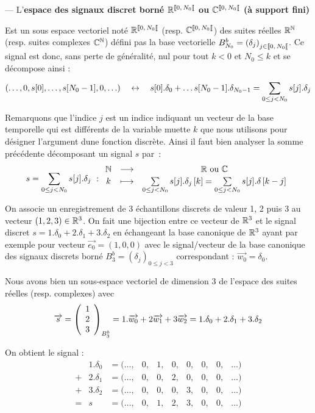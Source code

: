 \begin{definition}
  \label{def:signal_discret_borne}
  --- L'\textbf{espace des signaux discret borné $\RNborne$ ou
    $\CNborne$ (à support fini)}

  Est un sous espace vectoriel noté $\RNborne$ (resp. $\CNborne$) des
  suites réelles $\mathbb{R}^{\mathbb{N}}$ (resp. suites complexes $\mathbb{C}^{\mathbb{N}}$) défini pas la
  base vectorielle $B_{N_0}^b=\left(\delta_j\right)_{j\in\SN0}$. Ce
  signal est donc, sans perte de généralité, nul pour tout $k<0$ et
  $ N_0\leq k$ et se décompose ainsi :
  \begin{equation*}
    (\ldots,0, s[0], \dots, s[N_0-1], 0, \ldots) \quad \leftrightarrow \quad s[0].\delta_0 + \dots s[N_0-1].\delta_{N_0-1} = \sum\limits_{0\leq j< N_0}^{}{s[j].\delta_j}
  \end{equation*}

  
\end{definition}

Remarquons que l'indice $j$ est un indice indiquant un vecteur de la
base temporelle qui est différents de la variable muette $k$ que nous
utilisons pour désigner l'argument dune fonction discrète. Ainsi il
faut bien analyser la somme précédente décomposant un signal $s$ par~:
\begin{equation}
  s = \sum\limits_{0\leq j< N_0}^{}{s[j].\delta_j}~: \begin{array}{ccc} \mathbb{N} & \longrightarrow & \mathbb{R} \text{ ou } \mathbb{C} \\ k & \longmapsto & \sum\limits_{0\leq j< N_0}^{}{s[j].\delta_j\left[k\right]}={\sum\limits_{0\leq j< N_0}^{}{s[j].\delta\left[k-j\right]}} \\ \end{array}
\end{equation}

\begin{exemple}
  On associe un enregistrement de 3 échantillons discrets de valeur 1,
  2 puis 3 au vecteur $(1, 2, 3)\in\mathbb{R}^3$. On fait une bijection entre
  ce vecteur de $\mathbb{R}^3$ et le signal discret
  $s=1.\delta_0+2.\delta_1+3.\delta_2$ en échangeant la base canonique
  de $\mathbb{R}^3$ ayant par exemple pour vecteur $\vec{e_0}=(1,0,0)$ avec le
  signal/vecteur de la base canonique des signaux discrets borné
  $B_3^b=\left(\delta_j\right)_{0\leq j<3}$ correspondant :
  $\vec{w_0} = \delta_0$.

  Nous avons bien un sous-espace vectoriel de dimension 3 de l'espace
  des suites réelles (resp. complexes) avec
  $$\overrightarrow{s} = \left(\begin{array}{c} {1} \\ {2} \\ {3} \end{array}\right)_{B_3^b} = 1.\overrightarrow{w_0}+2\overrightarrow{w_1}+3\overrightarrow{w_2} = 1.\delta_0+2.\delta_1+3.\delta_2$$

  On obtient le signal :
  $$
  \begin{array}{llcccccccc}
    &1.\delta_0 & =(\ldots, &0 , &1, &0, &0, &0, &0, &\ldots)\\
    +&2.\delta_1 & =(\ldots, &0 , &0, &2, &0, &0, &0, &\ldots)\\
    +&3.\delta_2 & =(\ldots, &0 , &0, &0, &3, &0, &0, &\ldots)\\\hline
    =& s  & =(\ldots, &0 , &1, &2, &3, &0, &0, &\ldots)
  \end{array}
  $$
\end{exemple}


